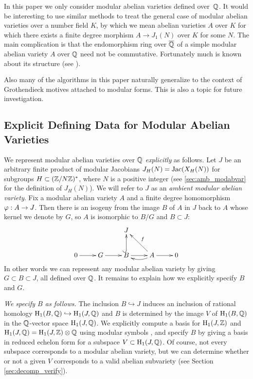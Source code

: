 \documentclass{article}
\begin{document}
\begin{remark}
	In this paper we only consider modular abelian varieties defined
	over~$\mathbb{Q}$.  It would be interesting to use similar methods to treat
	the general case of modular abelian varieties over a number field
	$K$, by which we mean abelian varieties $A$ over $K$ for which there
	exists a finite degree morphism $A\to J_1(N)$ over $K$ for some
	$N$. The main complication is that the endomorphism ring over
	$\overline{\mathbb{Q}}$ of a simple modular abelian variety $A$ over $\mathbb{Q}$ need not
	be commutative.  Fortunately much is known about its structure (see
	\cite{ribet:twistsendoalg}).

	Also many of the algorithms in this paper naturally generalize to
	the context of Grothendieck motives attached to modular forms.  This
	is also a topic for future investigation.
\end{remark}



\subsection{Explicit Defining Data for Modular Abelian Varieties}
We represent modular abelian varieties over $\mathbb{Q}$ {\em explicitly} as
follows. Let $J$ be an arbitrary finite product of modular Jacobians
$J_H(N)=\operatorname{Jac}(X_H(N))$ for subgroups $H\subset (\mathbb{Z}/N\mathbb{Z})^*$, where
$N$ is a positive integer (see \ref{sec:amb_modabvar} for the definition
of $J_H(N)$).  We will refer to $J$ as an \emph{ambient modular abelian
	variety}.
Fix a modular abelian variety $A$ and a
finite degree homomorphism $\varphi: A\to J$.  Then there is an isogeny
from the image $B$ of $A$ in $J$ back to $A$ whose kernel we denote by
$G$, so $A$ is isomorphic to $B/G$ and $B\subset J$:
$$
	\xymatrix{
	& & J & & \\
	0\ar[r]& G \ar[r]& B\ar@{^(->}[u] \ar[r]& A\ar[r] \ar@/^/[l]\ar[ul]_{f} & 0
	}
$$
In other words we can represent any modular abelian variety by giving
$G\subset B\subset J$, all defined over $\mathbb{Q}$.  It remains to explain
how we explicitly specify $B$ and $G$.

	{\em We specify $B$ as follows.}  The inclusion $B \hookrightarrow J$
induces an inclusion of rational homology $\operatorname{H}_1(B, \mathbb{Q}) \hookrightarrow
	\operatorname{H}_1(J, \mathbb{Q})$ and $B$ is determined by the image $V$ of $\operatorname{H}_1(B,\mathbb{Q})$ in
the $\mathbb{Q}$-vector space $\operatorname{H}_1(J,\mathbb{Q})$.  We explicitly compute a basis for
$\operatorname{H}_1(J,\mathbb{Z})$ and $\operatorname{H}_1(J,\mathbb{Q})=\operatorname{H}_1(J,\mathbb{Z})\otimes \mathbb{Q}$ using modular
symbols \cite{stein:modform}, and specify $B$ by giving a basis in
reduced echelon form for a subspace $V \subset \operatorname{H}_1(J, \mathbb{Q})$.  Of
course, not every subspace corresponds to a modular abelian variety,
but we can determine whether or not a given $V$ corresponds to a valid
abelian subvariety (see Section \ref{sec:decomp_verify}).
\end{document}
